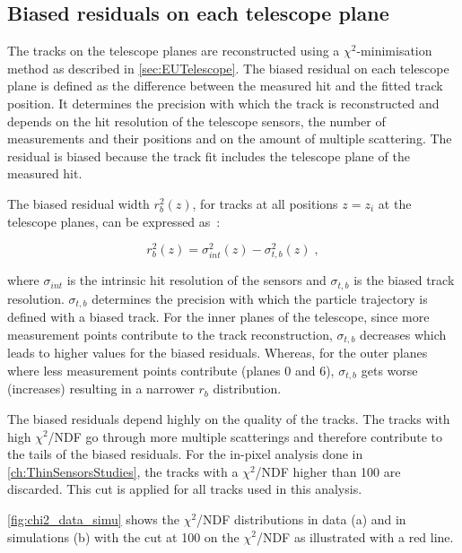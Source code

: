 \subsection{Biased residuals on each telescope plane}

The tracks on the telescope planes are reconstructed using a
$\chi^2$-minimisation method as described in
\cref{sec:EUTelescope}. The biased residual on each telescope plane is
defined as the difference between the measured hit and the fitted
track position. It determines the precision with which the track is
reconstructed and depends on the hit resolution of the telescope
sensors, the number of measurements and their positions and on the
amount of multiple scattering. The residual is biased because the
track fit includes the telescope plane of the measured hit.

The biased residual width $r_b^2(z)$, for tracks at all positions
$z=z_i$ at the telescope planes, can be expressed
as~\cite{Jansen:2016bkd}:

\begin{equation}
r_b^2(z)=\sigma_{int}^2(z)-\sigma_{t,b}^2(z) \; , 
\end{equation}

where $\sigma_{int}$ is the intrinsic hit resolution of the sensors
and $\sigma_{t,b}$ is the biased track resolution. $\sigma_{t,b}$
determines the precision with which the particle trajectory is defined
with a biased track. For the inner planes of the telescope, since more
measurement points contribute to the track reconstruction,
$\sigma_{t,b}$ decreases which leads to higher values for the biased
residuals. Whereas, for the outer planes where less measurement points
contribute (planes 0 and 6), $\sigma_{t,b}$ gets worse (increases)
resulting in a narrower $r_b$ distribution.

The biased residuals depend highly on the quality of the tracks. The
tracks with high $\chi^2$/NDF go through more multiple scatterings and
therefore contribute to the tails of the biased residuals. For the
in-pixel analysis done in \cref{ch:ThinSensorsStudies}, the tracks
with a $\chi^2$/NDF higher than 100 are discarded. This cut is applied
for all tracks used in this analysis.

\cref{fig:chi2_data_simu} shows the $\chi^2$/NDF distributions in data
(a) and in simulations (b) with the cut at 100 on the $\chi^2$/NDF as
illustrated with a red line.

